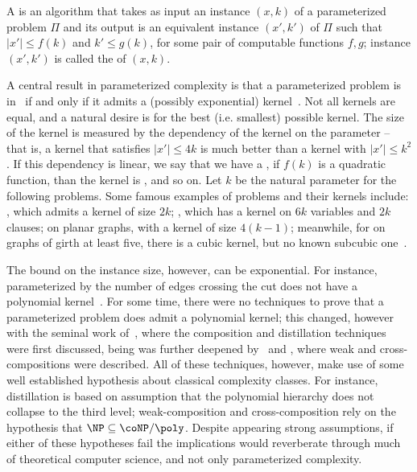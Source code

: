\begin{class_definition*}[Kernelization]
    A   is an algorithm that takes as input an instance $(x,k)$ of a parameterized problem $\Pi$ and its output is an equivalent instance $(x',k')$ of $\Pi$ such that $|x'| \leq f(k)$ and $k' \leq g(k)$, for some pair of computable functions $f,g$; instance $(x',k')$ is called the  of $(x,k)$.
\end{class_definition*}

A central result in parameterized complexity is that a parameterized problem is in \FPT\ if and only if it admits a (possibly exponential) kernel~\cite{book-kernels}.
Not all kernels are equal, and a natural desire is for the best (i.e. smallest) possible kernel.
The size of the kernel is measured by the dependency of the kernel on the parameter -- that is, a kernel that satisfies $|x'| \leq 4k$ is much better than a kernel with $|x'| \leq k^2$.
If this dependency is linear, we say that we have a , if $f(k)$ is a quadratic function, than the kernel is , and so on.
Let $k$ be the natural parameter for the following problems.
Some famous examples of problems and their kernels include: , which admits a kernel of size $2k$; , which has a kernel on $6k$ variables and $2k$ clauses;  on planar graphs, with a kernel of size $4(k - 1)$;
meanwhile, for  on graphs of girth at least five, there is a cubic kernel, but no known subcubic one~\citep{cygan_parameterized, book-kernels}.

The bound on the instance size, however, can be exponential.
For instance,  parameterized by the number of edges crossing the cut does not have a polynomial kernel~\citep{matching_cut_ipec}.
For some time, there were no techniques to prove that a parameterized problem does  admit a polynomial kernel; this changed, however with the seminal work of~\cite{BodlaenderDFH09}, where the composition and distillation techniques were first discussed, being was further deepened
by~\cite{weak_composition} and \cite{BodlaenderJK14}, where weak and cross-compositions were described.
All of these techniques, however, make use of some well established hypothesis about classical complexity classes.
For instance, distillation is based on assumption that the polynomial hierarchy does not collapse to the third level; weak-composition and cross-composition rely on the hypothesis that $\NP \subseteq \coNP/\poly$.
Despite appearing strong assumptions, if either of these hypotheses fail the implications would reverberate through much of theoretical computer science, and not only parameterized complexity.

